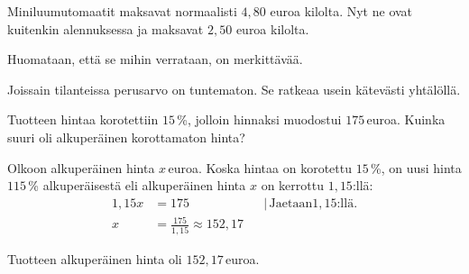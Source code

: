 \begin{esimerkki}
Miniluumutomaatit maksavat normaalisti $4,80$ euroa kilolta. Nyt ne ovat kuitenkin alennuksessa ja maksavat $2,50$ euroa kilolta.
	\begin{esimratk}

\end{esimratk}		
     \begin{esimvast}
     
Huomataan, että se mihin verrataan, on merkittävää.
      \end{esimvast}
     \end{esimerkki}

Joissain tilanteissa perusarvo on tuntematon. Se ratkeaa usein kätevästi yhtälöllä.
\begin{esimerkki}
Tuotteen hintaa korotettiin $15$\,\%, jolloin hinnaksi muodostui $175$\,euroa. Kuinka suuri oli alkuperäinen korottamaton hinta?
	\begin{esimratk}
Olkoon alkuperäinen hinta $x$\,euroa. Koska hintaa on korotettu $15$\,\%, on uusi hinta $115$\,\% alkuperäisestä eli alkuperäinen hinta $x$ on kerrottu $1,15$:llä:
\begin{align*}
	1,15x	&= 175	&	&|\, \text{Jaetaan} 1,15\text{:llä}.\\
	x	&= \frac{175}{1,15} \approx 152,17
\end{align*}
	\end{esimratk}
    \begin{esimvast}
    Tuotteen alkuperäinen hinta oli $152,17$\,euroa.
    \end{esimvast}
\end{esimerkki}

